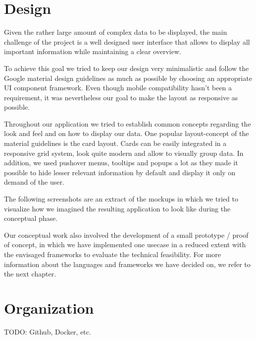 \section{Design}
Given the rather large amount of complex data to be displayed, the main challenge of the project is a well designed user interface that allows to display all important information while maintaining a clear overview.

To achieve this goal we tried to keep our design very minimalistic and follow the Google material design guidelines as much as possible by choosing an appropriate UI component framework. Even though mobile compatibility hasn't been a requirement, it was nevertheless our goal to make the layout as responsive as possible.

Throughout our application we tried to establish common concepts regarding the look and feel and on how to display our data. One popular layout-concept of the material guidelines is the card layout. Cards can be easily integrated in a responsive grid system, look quite modern and allow to visually group data. In addition, we used pushover menus, tooltips and popups a lot as they made it possible to hide lesser relevant information by default and display it only on demand of the user.

The following screenshots are an extract of the mockups in which we tried to visualize how we imagined the resulting application to look like during the conceptual phase. 


Our conceptual work also involved the development of a small prototype / proof of concept, in which we have implemented one usecase in a reduced extent with the envisaged frameworks to evaluate the technical feasibility. For more information about the languages and frameworks we have decided on, we refer to the next chapter.

\section{Organization}
TODO: Github, Docker, etc.